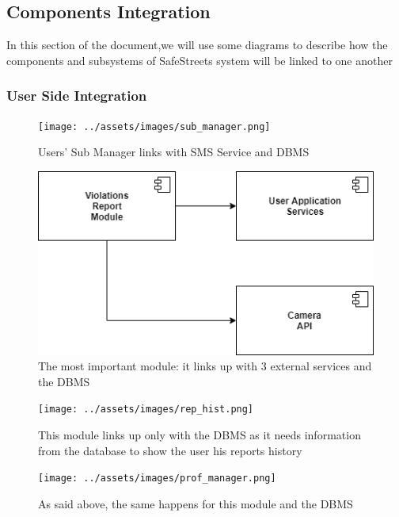 \documentclass[12pt,a4paper]{article}
\begin{document}
\subsection{Components Integration}
In this section of the document,we will use some diagrams to describe how the components and subsystems of SafeStreets system will be linked to one another
\subsubsection{User Side Integration}
\begin{figure}[H]
		\centering
		\texttt{[image: ../assets/images/sub\_manager.png]}
		\caption{Users' Sub Manager links with SMS Service and DBMS}
\end{figure}
\begin{figure}[H]
		\centering
		\includegraphics[width=0.5\linewidth]{../assets/images/viol_rep.png}
		\caption{The most important module: it links up with 3 external services and the DBMS}
\end{figure}
\begin{figure}[H]
		\centering
		\texttt{[image: ../assets/images/rep\_hist.png]}
		\caption{This module links up only with the DBMS as it needs information from the database to show the user his reports history}
\end{figure}
\begin{figure}[H]
		\centering
		\texttt{[image: ../assets/images/prof\_manager.png]}
		\caption{As said above, the same happens for this module and the DBMS}
\end{figure}
\end{document}
